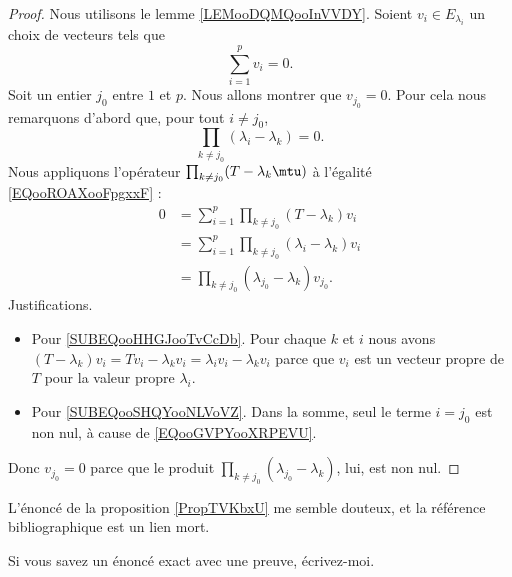 \begin{proof}
    Nous utilisons le lemme \ref{LEMooDQMQooInVVDY}. Soient \( v_i\in E_{\lambda_i}\) un choix de vecteurs tels que 
    \begin{equation}        \label{EQooROAXooFpgxxF}
        \sum_{i=1}^pv_i=0. 
    \end{equation}
    Soit un entier \( j_0\) entre \( 1\) et \( p\). Nous allons montrer que \( v_{j_0}=0\). Pour cela nous remarquons d'abord que, pour tout \( i\neq j_0\),
    \begin{equation}        \label{EQooGVPYooXRPEVU}
        \prod_{k\neq j_0}(\lambda_i-\lambda_k)=0.
    \end{equation}
    Nous appliquons l'opérateur \( \prod_{k\neq j_0}(T-\lambda_k\mtu)\) à l'égalité \eqref{EQooROAXooFpgxxF} :
    \begin{subequations}
        \begin{align}
            0 & = \sum_{i=1}^p\prod_{k\neq j_0}(T-\lambda_k)v_i               \\
              & = \sum_{i=1}^p\prod_{k\neq j_0}(\lambda_i-\lambda_k)v_i       \label{SUBEQooHHGJooTvCcDb}\\
              & = \prod_{k\neq j_0}(\lambda_{j_0}-\lambda_k)v_{j_0}.                  \label{SUBEQooSHQYooNLVoVZ}
        \end{align}
    \end{subequations}
    Justifications.
    \begin{itemize}
        \item Pour \eqref{SUBEQooHHGJooTvCcDb}. Pour chaque \( k\) et \( i\) nous avons \( (T-\lambda_k)v_i=Tv_i-\lambda_kv_i=\lambda_iv_i-\lambda_kv_i\) parce que \( v_i\) est un vecteur propre de \( T\) pour la valeur propre \( \lambda_i\).
        \item Pour \eqref{SUBEQooSHQYooNLVoVZ}. Dans la somme, seul le terme \( i=j_0\) est non nul, à cause de \eqref{EQooGVPYooXRPEVU}.
    \end{itemize}
    Donc \( v_{j_0}=0\) parce que le produit \( \prod_{k\neq j_0}(\lambda_{j_0}-\lambda_k)\), lui, est non nul.
\end{proof}

\begin{probleme}
    L'énoncé de la proposition \ref{PropTVKbxU} me semble douteux, et la référence bibliographique est un lien mort.

    Si vous savez un énoncé exact avec une preuve, écrivez-moi.
\end{probleme}


